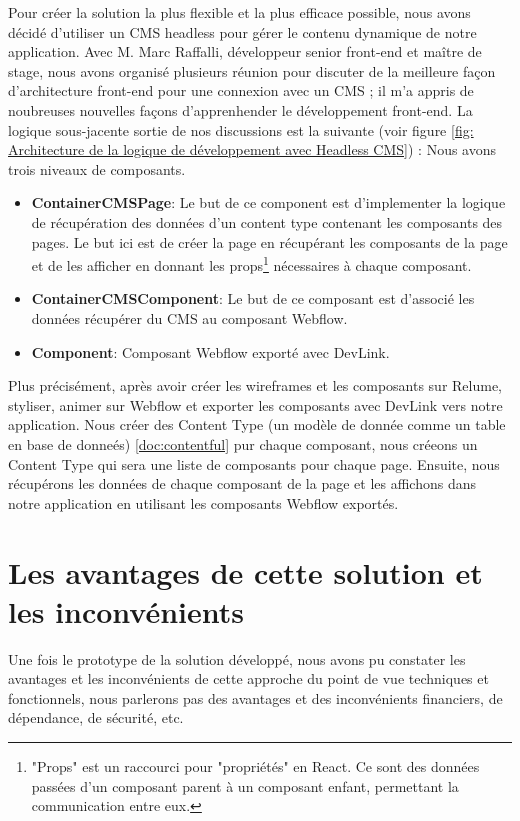 Pour créer la solution la plus flexible et la plus efficace possible, nous avons décidé d'utiliser un CMS headless pour gérer le contenu dynamique de notre application. Avec M. Marc Raffalli, développeur senior front-end et maître de stage, nous avons organisé plusieurs réunion pour discuter de la meilleure façon d'architecture front-end pour une connexion avec un CMS ; il m'a appris de noubreuses nouvelles façons d'apprenhender le développement front-end. La logique sous-jacente sortie de nos discussions est la suivante (voir figure \ref{fig: Architecture de la logique de développement avec Headless CMS}) :
Nous avons trois niveaux de composants.
\begin{itemize}
  \item \textbf{ContainerCMSPage}: Le but de ce component est d'implementer la logique de récupération des données d'un content type contenant les composants des pages. Le but ici est de créer la page en récupérant les composants de la page et de les afficher en donnant les props\footnote{"Props" est un raccourci pour "propriétés" en React. Ce sont des données passées d'un composant parent à un composant enfant, permettant la communication entre eux.} nécessaires à chaque composant.
  \item \textbf{ContainerCMSComponent}: Le but de ce composant est d'associé les données récupérer du CMS au composant Webflow.
  \item \textbf{Component}: Composant Webflow exporté avec DevLink.
\end{itemize}
\vspace{0.8cm}
Plus précisément, après avoir créer les wireframes et les composants sur Relume, styliser, animer sur Webflow et exporter les composants avec DevLink vers notre application. Nous créer des Content Type (un modèle de donnée comme un table en base de donneés) \ref{doc:contentful} pur chaque composant, nous créeons un Content Type qui sera une liste de composants pour chaque page. Ensuite, nous récupérons les données de chaque composant de la page et les affichons dans notre application en utilisant les composants Webflow exportés.

\section{Les avantages de cette solution et les inconvénients}

Une fois le prototype de la solution développé, nous avons pu constater les avantages et les inconvénients de cette approche du point de vue techniques et fonctionnels, nous parlerons pas des avantages et des inconvénients financiers, de dépendance, de sécurité, etc.


